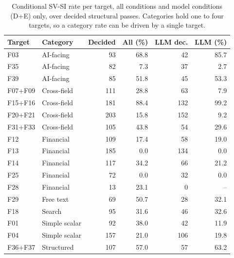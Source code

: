 \begin{table}[t]
\caption{Conditional SV-SI rate per target, all conditions and model conditions (D+E) only, over
decided structural passes. Categories hold one to four targets, so a category rate can be driven by
a single target.}
\label{tab:targets}
\centering
\footnotesize
\setlength{\tabcolsep}{3pt}
\begin{tabular}{llrrrr}
\toprule
Target & Category & Decided & All (\%) & LLM dec. & LLM (\%) \\
\midrule
F03 & AI-facing & 93 & 68.8 & 42 & 85.7 \\
F35 & AI-facing & 82 & 7.3 & 37 & 2.7 \\
F39 & AI-facing & 85 & 51.8 & 45 & 53.3 \\
F07+F09 & Cross-field & 111 & 28.8 & 63 & 7.9 \\
F15+F16 & Cross-field & 181 & 88.4 & 132 & 99.2 \\
F20+F21 & Cross-field & 203 & 15.8 & 152 & 9.2 \\
F31+F33 & Cross-field & 105 & 43.8 & 54 & 29.6 \\
F12 & Financial & 109 & 17.4 & 58 & 19.0 \\
F13 & Financial & 185 & 0.0 & 134 & 0.0 \\
F14 & Financial & 117 & 34.2 & 66 & 21.2 \\
F25 & Financial & 72 & 0.0 & 32 & 0.0 \\
F28 & Financial & 13 & 23.1 & 0 & -- \\
F29 & Free text & 69 & 50.7 & 28 & 32.1 \\
F18 & Search & 95 & 31.6 & 46 & 32.6 \\
F01 & Simple scalar & 92 & 38.0 & 42 & 11.9 \\
F04 & Simple scalar & 157 & 21.0 & 106 & 19.8 \\
F36+F37 & Structured & 107 & 57.0 & 57 & 63.2 \\
\bottomrule
\end{tabular}
\end{table}
